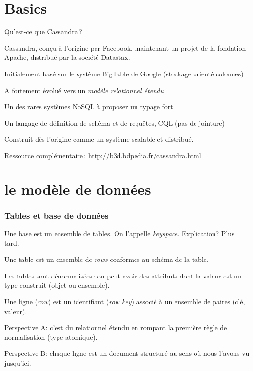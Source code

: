 

\section{Basics}

\begin{frame}{Qu'est-ce que Cassandra\,?}

Cassandra, conçu à l'origine par Facebook, maintenant un projet de la fondation Apache,
distribué par la société Datastax.

\begin{redbullet}
  \item Initialement basé sur le système BigTable de Google (stockage orienté colonnes)
   \item A fortement évolué vers un \textit{modèle relationnel étendu}
  \item Un des rares systèmes NoSQL à proposer un typage fort
  \item Un langage de définition de schéma et de requêtes, CQL (pas de jointure)
    \end{redbullet}
   \vfill
   
Construit dès l'origine comme un système \alert{scalable} et \alert{distribué}.

\vfill

Ressource complémentaire\,: http://b3d.bdpedia.fr/cassandra.html

\end{frame}


\section{le modèle de données}


\begin{frame}
\frametitle{Tables et base de données}


Une \alert{base} est un ensemble de tables. On l'appelle \textit{keyspace}. Explication? Plus tard.

\vfill

Une \alert{table} est un ensemble de \textit{rows} conformes
au schéma de la table.

\vfill

Les tables sont \alert{dénormalisées}\,: on peut avoir des attributs dont
la valeur est un type construit (objet ou ensemble).
\vfill



Une ligne (\textit{row}) est un identifiant (\textit{row key}) associé à un ensemble de paires (clé, valeur).

\vfill

\alert{Perspective A}: c'est du relationnel étendu en rompant la première règle de normalisation (type atomique).

\vfill

\alert{Perspective B}: chaque ligne est un document structuré au sens où nous l'avons vu jusqu'ici.

\end{frame}




